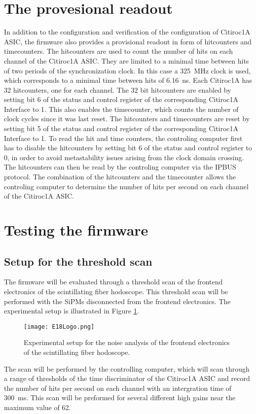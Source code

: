 \section{The provesional readout}
In addition to the configuration and verification of the configuration of Citiroc1A ASIC, the firmware also provides a provisional readout in form of hitcounters and timecounters. 
\newline
The hitcounters are used to count the number of hits on each channel of the Citiroc1A ASIC.
\newline
They are limited to a minimal time between hits of two periods of the synchronization clock.
In this case a \SI{325}{\mega\hertz} clock is used, which corresponds to a minimal time between hits of \SI{6.16}{\nano\second}.
\newline
Each Citiroc1A has 32 hitcounters, one for each channel.
The 32 bit hitcounters are enabled by setting bit 6 of the status and control register of the corresponding Citiroc1A Interface to 1. 
This also enables the timecounter, which counts the number of clock cycles since it was last reset. 
\newline
The hitcounters and timecounters are reset by setting bit 5 of the status and control register of the corresponding Citiroc1A Interface to 1.
\newline
To read the hit and time counters, the controling computer first has to disable the hitcounters by setting bit 6 of the status and control register to 0, in order to avoid metastability issues arising from the clock domain crossing.
The hitcounters can then be read by the controling computer via the IPBUS protocol.
\newline
The combination of the hitcounters and the timecounter allows the controling computer to determine the number of hits per second on each channel of the Citiroc1A ASIC. 
\section{Testing the firmware}
\subsection{Setup for the threshold scan}
The firmware will be evaluated through a threshold scan of the frontend electronics of the scintillating fiber hodoscope. 
This threshold scan will be performed with the SiPMs disconnected from the frontend electronics. 
The experimental setup is illustrated in Figure \ref{fig:noise_setup}.
\begin{figure}[H]
    \centering
    \texttt{[image: E18Logo.png]}%
    \caption{Experimental setup for the noise analysis of the frontend electronics of the scintillating fiber hodoscope.}
    \label{fig:noise_setup}
\end{figure}
The scan will be performed by the controlling computer, 
which will scan through a range of thresholds of the time discriminator of the Citiroc1A ASIC and record the number of hits per second on each channel with an intergration time of \SI{300}{\milli\second}.
This scan will be preformed for several different high gains near the maximum value of 62.
